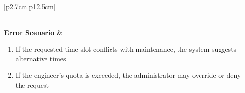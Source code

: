 \begin{table}[H]
\begin{tabular}{|p{2.7cm}|p{12.5cm}|}
\begin{minipage}[t]{\linewidth}
                                  \end{minipage}                                \\
        \hline
        \textbf{Error Scenario} & \begin{minipage}[t]{\linewidth}
                                      \begin{enumerate}[topsep=0pt,itemsep=1pt,parsep=0pt,partopsep=0pt]
                                          \item If the requested time slot conflicts with maintenance, the system suggests
                                                alternative times
                                          \item If the engineer's quota is exceeded, the administrator may override or deny the
                                                request
                                      \end{enumerate}
                                  \end{minipage}                           \\
        \hline
    \end{tabular}
    \label{tab:admin-approve-reservation}
\end{table}
